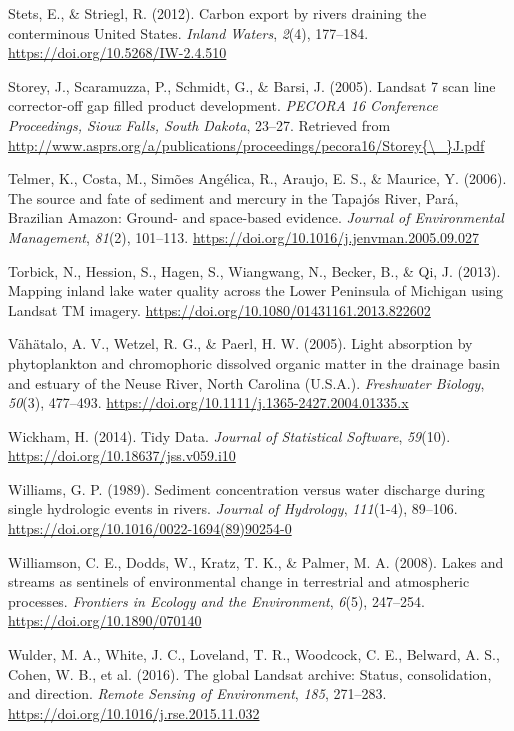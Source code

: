 \documentclass[]{article}
\begin{document}
\leavevmode\hypertarget{ref-Stets2012}{}%
Stets, E., \& Striegl, R. (2012). Carbon export by rivers draining the
conterminous United States. \emph{Inland Waters}, \emph{2}(4), 177--184.
\url{https://doi.org/10.5268/IW-2.4.510}

\leavevmode\hypertarget{ref-Storey2005}{}%
Storey, J., Scaramuzza, P., Schmidt, G., \& Barsi, J. (2005). Landsat 7
scan line corrector-off gap filled product development. \emph{PECORA 16
Conference Proceedings, Sioux Falls, South Dakota}, 23--27. Retrieved
from
\href{http://www.asprs.org/a/publications/proceedings/pecora16/Storey\%7B/_\%7DJ.pdf}{http://www.asprs.org/a/publications/proceedings/pecora16/Storey\{\textbackslash{}\_\}J.pdf}

\leavevmode\hypertarget{ref-Telmer2006}{}%
Telmer, K., Costa, M., Simões Angélica, R., Araujo, E. S., \& Maurice,
Y. (2006). The source and fate of sediment and mercury in the Tapajós
River, Pará, Brazilian Amazon: Ground- and space-based evidence.
\emph{Journal of Environmental Management}, \emph{81}(2), 101--113.
\url{https://doi.org/10.1016/j.jenvman.2005.09.027}

\leavevmode\hypertarget{ref-Torbick2013}{}%
Torbick, N., Hession, S., Hagen, S., Wiangwang, N., Becker, B., \& Qi,
J. (2013). Mapping inland lake water quality across the Lower Peninsula
of Michigan using Landsat TM imagery.
\url{https://doi.org/10.1080/01431161.2013.822602}

\leavevmode\hypertarget{ref-Vahatalo2005}{}%
Vähätalo, A. V., Wetzel, R. G., \& Paerl, H. W. (2005). Light absorption
by phytoplankton and chromophoric dissolved organic matter in the
drainage basin and estuary of the Neuse River, North Carolina (U.S.A.).
\emph{Freshwater Biology}, \emph{50}(3), 477--493.
\url{https://doi.org/10.1111/j.1365-2427.2004.01335.x}

\leavevmode\hypertarget{ref-Wickham2014}{}%
Wickham, H. (2014). Tidy Data. \emph{Journal of Statistical Software},
\emph{59}(10). \url{https://doi.org/10.18637/jss.v059.i10}

\leavevmode\hypertarget{ref-Williams1989}{}%
Williams, G. P. (1989). Sediment concentration versus water discharge
during single hydrologic events in rivers. \emph{Journal of Hydrology},
\emph{111}(1-4), 89--106.
\url{https://doi.org/10.1016/0022-1694(89)90254-0}

\leavevmode\hypertarget{ref-Williamson2008}{}%
Williamson, C. E., Dodds, W., Kratz, T. K., \& Palmer, M. A. (2008).
Lakes and streams as sentinels of environmental change in terrestrial
and atmospheric processes. \emph{Frontiers in Ecology and the
Environment}, \emph{6}(5), 247--254.
\url{https://doi.org/10.1890/070140}

\leavevmode\hypertarget{ref-Wulder2016}{}%
Wulder, M. A., White, J. C., Loveland, T. R., Woodcock, C. E., Belward,
A. S., Cohen, W. B., et al. (2016). The global Landsat archive: Status,
consolidation, and direction. \emph{Remote Sensing of Environment},
\emph{185}, 271--283. \url{https://doi.org/10.1016/j.rse.2015.11.032}
\end{document}
